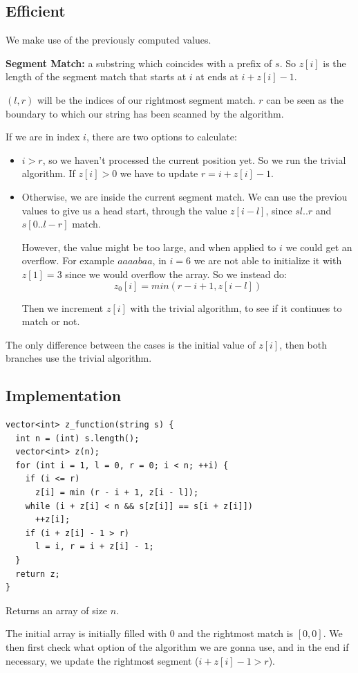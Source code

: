 \documentclass{IEEEtran}
\begin{document}
    \subsection{Efficient} 
      We make use of the previously computed values. \par 
      \textbf{Segment Match:} a substring which coincides with a prefix of $s$. So $z[i]$ is the length of the segment match that starts at $i$ at ends at $i+z[i]-1$.\par 
      $(l,r)$ will be the indices of our rightmost segment match. $r$ can be seen as the boundary to which our string has been scanned by the algorithm.\par 
      If we are in index $i$, there are two options to calculate: 
      \begin{itemize}
        \item $i>r$, so we haven't processed the current position yet. So we run the trivial algorithm. If $z[i]>0$ we have to update $r = i + z[i] - 1$.
        \item Otherwise, we are inside the current segment match. We can use the previou values to give us a head start, through the value $z[i-l]$, since $s{l..r}$ and $s[0..l-r]$ match.\par 
        However, the value might be too large, and when applied to $i$ we could get an overflow. For example $aaaabaa$, in $i=6$ we are not able to initialize it with $z[1]=3$ since we would overflow the array. So we instead do:
        $$z_0[i]=min(r-i+1,z[i-l])$$
        \par Then we increment $z[i]$ with the trivial algorithm, to see if it continues to match or not.
      \end{itemize}
      The only difference between the cases is the initial value of $z[i]$, then both branches use the trivial algorithm. 
    \subsection{Implementation}
      \begin{lstlisting}
vector<int> z_function(string s) {
  int n = (int) s.length();
  vector<int> z(n);
  for (int i = 1, l = 0, r = 0; i < n; ++i) {
    if (i <= r)
      z[i] = min (r - i + 1, z[i - l]);
    while (i + z[i] < n && s[z[i]] == s[i + z[i]])
      ++z[i];
    if (i + z[i] - 1 > r)
      l = i, r = i + z[i] - 1;
  }
  return z;
}
      \end{lstlisting}
      \par Returns an array of size $n$. \par
      The initial array is initially filled with $0$ and the rightmost match is $[0,0]$. We then first check what option of the algorithm we are gonna use, and in the end if necessary, we update the rightmost segment ($i + z[i] - 1 > r$).
\end{document}
